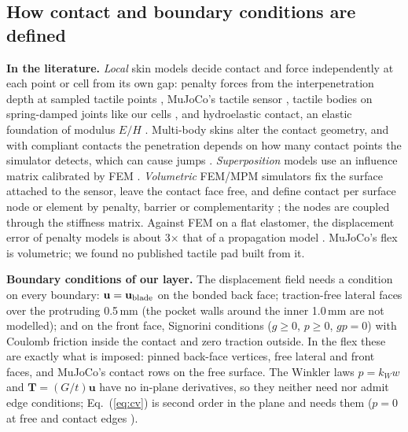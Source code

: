 \documentclass[10pt,twocolumn]{article}
\begin{document}
\subsection{How contact and boundary conditions are defined}\label{sec:contactbc}
\textbf{In the literature.} \emph{Local} skin models decide contact and force independently at each point or cell
from its own gap: penalty forces from the interpenetration depth at sampled tactile points \cite{tacsl2025,xu2022corl},
MuJoCo's tactile sensor \cite{mujoco_tactile}, tactile bodies on spring-damped joints like our cells
\cite{hu_ye2025}, and hydroelastic contact, an elastic foundation of modulus $E/H$ \cite{elandt2019,drake_hydro_docs}.
Multi-body skins alter the contact geometry, and with compliant contacts the penetration depends on how many contact
points the simulator detects, which can cause jumps \cite{kasolowsky2024}. \emph{Superposition} models use an
influence matrix calibrated by FEM \cite{taxim2021,ma2019}. \emph{Volumetric} FEM/MPM simulators fix the surface
attached to the sensor, leave the contact face free, and define contact per surface node or element by penalty,
barrier or complementarity \cite{difftactile2024,tacipc2023,taccel2025,narang2021icra,sferrazza2019,tacchi2023}; the
nodes are coupled through the stiffness matrix. Against FEM on a flat elastomer, the displacement error of penalty
models is about 3$\times$ that of a propagation model \cite[Table~II]{etac2026}. MuJoCo's flex is volumetric; we found
no published tactile pad built from it.

\textbf{Boundary conditions of our layer.} The displacement field needs a condition on every boundary: $\mathbf
u=\mathbf u_{\rm blade}$ on the bonded back face; traction-free lateral faces over the protruding 0.5\,mm (the
pocket walls around the inner 1.0\,mm are not modelled); and on the front face, Signorini conditions ($g\ge0$,
$p\ge0$, $gp=0$) with Coulomb friction inside the contact and zero traction outside. In the flex these are exactly
what is imposed: pinned back-face vertices, free lateral and front faces, and MuJoCo's contact rows on the free
surface. The Winkler laws $p=k_Ww$ and $\mathbf T=(G/t)\mathbf u$ have no in-plane derivatives, so they neither need
nor admit edge conditions; Eq.~(\ref{eq:cv}) is second order in the plane and needs them ($p=0$ at free and
contact edges \cite{argatov_mishuris_popov2016}).
\end{document}
